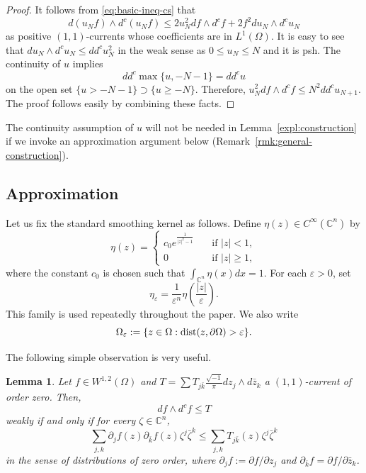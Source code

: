 \documentclass{amsart}
\renewcommand{\d}{\partial}
\newcommand{\ii}{\sqrt{-1}}
\newcommand{\veps}{\varepsilon}
\newcommand{\ze}{\zeta}
\newcommand{\Om}{\Omega}
\newcommand{\bC}{\mathbb{C}}
\newtheorem{lem}[thm]{Lemma}
\theoremstyle{definition}
\numberwithin{thm}{section}
\numberwithin{equation}{section}
\renewcommand{\[}{\begin{equation}}
\renewcommand{\]}{\end{equation}}
\newcommand{\wed}{\wedge}
\begin{document}
\begin{proof} It follows from \eqref{eq:basic-ineq-cs} that
$$
	d (u_N f) \wed d^c (u_N f) \leq 2 u_N^2 df\wed d^c f + 2 f^2 du_N \wed d^c u_N
$$
as positive $(1,1)$-currents whose coefficients are in $L^1(\Om)$. It is easy to see that $du_N \wed d^c u_N \leq dd^c u_N^2$ in the weak sense as  $0\leq u_N \leq N$ and it is psh.    The continuity of $u$ implies
$$
	dd^c \max\{u, -N-1\} = dd^c u 
$$
on the open set $\{u>-N-1\} \supset \{u \geq -N\}$. Therefore,  $u_N^2 df\wed d^c f \leq N^2 dd^c u_{N+1}$. The proof follows easily by combining these facts.
\end{proof}

The continuity assumption of $u$ will not be needed in Lemma~\ref{expl:construction} if we invoke an approximation argument below (Remark~\ref{rmk:general-construction}).%

\subsection{Approximation}
\label{ss:approx}

Let us fix the standard smoothing kernel  as follows. Define 
$ \eta(z) \in C^\infty(\bC^n)$ by 
$$
	\eta(z) 
= \begin{cases}  c_0 e^{\frac{1}{|z|^2-1}} &\quad \text{if }  |z| <1,\\
		0 &\quad \text{if } |z| \geq 1,
	\end{cases}
$$
where the constant $c_0$ is chosen such that $\int_{\bC^n} \eta (x) dx =1$. For each $\veps>0$, set 
\[ \label{eq:molifier}\eta_\veps = \frac{1}{\veps^n} \eta\left(\frac{|z|}{\veps} \right).
\]
This family is used repeatedly throughout the paper.  We also write
\[\label{eq:epsilon-dom}
	\Om_\veps := \{z\in \Om : {\rm dist} (z, \d\Om) >\veps\}.
\]

The following simple observation is very useful.
\begin{lem} \label{lem:ineq-weak} Let $f\in W^{1,2}(\Om)$ and $T = \sum T_{j\bar k}  \frac{\ii}{\pi}  dz_j \wed d\bar z_k$ a $(1,1)$-current of order zero. Then, 
$$
df \wed d^c f \leq T
$$ 
weakly 
if and only if   for every $\ze \in \bC^n$,
\[\label{eq:test-distribution}
	\sum_{j,k} \d_j f (z) \d_{\bar k} f (z) \ze^j \bar\ze^k \leq \sum_{j,k} T_{j\bar k} (z) \ze^j \bar\ze^k
\]
in the sense of distributions of zero order, where $\d_j f := \d f/\d z_j$ and $\d_{\bar k} f = \d f/\d\bar z_k$.
\end{lem}
\end{document}
